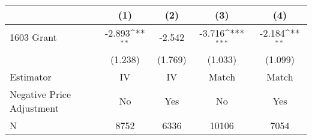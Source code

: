 {
\def\sym#1{\ifmmode^{#1}\else\(^{#1}\)\fi}
\begin{tabular}{l*{4}{c}}
\toprule
                    &\multicolumn{1}{c}{(1)}         &\multicolumn{1}{c}{(2)}         &\multicolumn{1}{c}{(3)}         &\multicolumn{1}{c}{(4)}         \\
\midrule
1603 Grant          &      -2.893\sym{**} &      -2.542         &      -3.716\sym{***}&      -2.184\sym{**} \\
                    &     (1.238)         &     (1.769)         &     (1.033)         &     (1.099)         \\
\midrule
Estimator           &          IV         &          IV         &       Match         &       Match         \\
Negative Price Adjustment&          No         &         Yes         &          No         &         Yes         \\
N                   &        8752         &        6336         &       10106         &        7054         \\
\bottomrule
\end{tabular}
}
